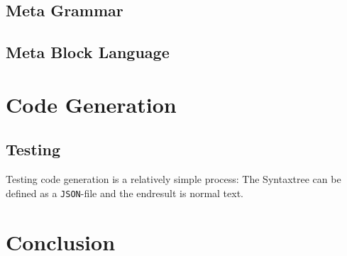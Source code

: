 \subsection{Meta Grammar}

\subsection{Meta Block Language}

\section{Code Generation}
\label{sec:code-generation-detail}

\subsection{Testing}

Testing code generation is a relatively simple process: The Syntaxtree can be defined as a \texttt{JSON}-file and the endresult is normal text.

\section{Conclusion}


